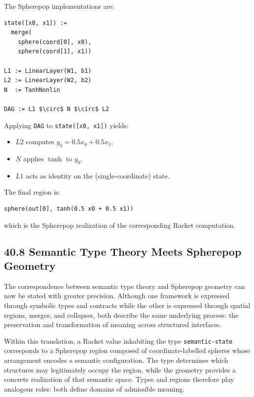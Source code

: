 \documentclass[12pt,letterpaper]{article}
\theoremstyle{remark}
\begin{document}
The Spherepop implementations are:

\begin{verbatim}
state([x0, x1]) :=
  merge(
    sphere(coord[0], x0),
    sphere(coord[1], x1))

L1 := LinearLayer(W1, b1)
L2 := LinearLayer(W2, b2)
N  := TanhNonlin

DAG := L1 $\circ$ N $\circ$ L2
\end{verbatim}

Applying \verb|DAG| to \verb|state([x0, x1])| yields:

\begin{itemize}
  \item $L2$ computes $y_0 = 0.5 x_0 + 0.5 x_1$,
  \item $N$ applies $\tanh$ to $y_0$,
  \item $L1$ acts as identity on the (single-coordinate) state.
\end{itemize}

The final region is:

\begin{verbatim}
sphere(out[0], tanh(0.5 x0 + 0.5 x1))
\end{verbatim}

which is the Spherepop realization of the corresponding Racket computation.

\subsection{40.8 Semantic Type Theory Meets Spherepop Geometry}

The correspondence between semantic type theory and Spherepop geometry can now be stated with greater precision. Although one framework is expressed through symbolic types and contracts while the other is expressed through spatial regions, merges, and collapses, both describe the same underlying process: the preservation and transformation of meaning across structured interfaces.

Within this translation, a Racket value inhabiting the type \verb|semantic-state| corresponds to a Spherepop region composed of coordinate-labelled spheres whose arrangement encodes a semantic configuration. The type determines which structures may legitimately occupy the region, while the geometry provides a concrete realization of that semantic space. Types and regions therefore play analogous roles: both define domains of admissible meaning.
\end{document}
